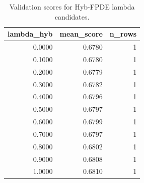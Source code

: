 \begin{table}[t]
\caption{Validation scores for Hyb-FPDE lambda candidates.}
\label{tab:lambda_distribution_computed}
\centering
\begin{tabular}{rrr}
\toprule
lambda\_hyb & mean\_score & n\_rows \\
\midrule
0.0000 & 0.6780 & 1 \\
0.1000 & 0.6780 & 1 \\
0.2000 & 0.6779 & 1 \\
0.3000 & 0.6782 & 1 \\
0.4000 & 0.6796 & 1 \\
0.5000 & 0.6797 & 1 \\
0.6000 & 0.6799 & 1 \\
0.7000 & 0.6797 & 1 \\
0.8000 & 0.6802 & 1 \\
0.9000 & 0.6808 & 1 \\
1.0000 & 0.6810 & 1 \\
\bottomrule
\end{tabular}

\end{table}
